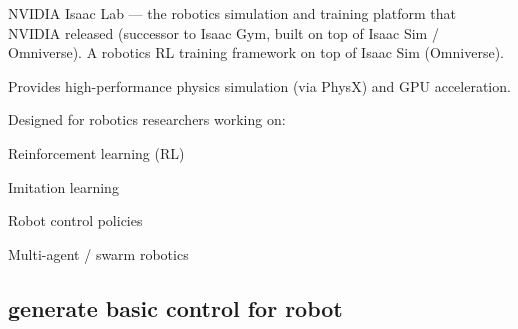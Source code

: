 \documentclass{article}
\begin{document}
NVIDIA Isaac Lab — the robotics simulation and training platform that NVIDIA released (successor to Isaac Gym, built on top of Isaac Sim / Omniverse).
A robotics RL training framework on top of Isaac Sim (Omniverse).

Provides high-performance physics simulation (via PhysX) and GPU acceleration.

Designed for robotics researchers working on:

Reinforcement learning (RL)

Imitation learning

Robot control policies

Multi-agent / swarm robotics



\subsection{generate basic control for robot}



















\end{document}
